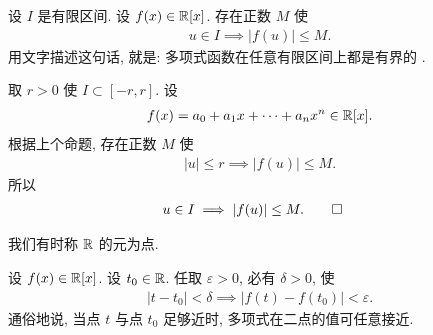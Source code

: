 \begin{proposition}
    设 $I$ 是有限区间. 设 $f(x) \in \mathbb{R}[x]$. 存在正数 $M$ 使
    \begin{align*}
        u \in I \implies |f(u)| \leq M.
    \end{align*}
    用文字描述这句话, 就是: 多项式函数在任意有限区间上都是有界的 .
\end{proposition}

\begin{pf}
    取 $r > 0$ 使 $I \subset [-r, r]$. 设
    \begin{align*}
        f(x) = a_0 + a_1 x + \cdots + a_n x^n \in \mathbb{R}[x].
    \end{align*}
    根据上个命题, 存在正数 $M$ 使
    \begin{align*}
        |u| \leq r \implies |f(u)| \leq M.
    \end{align*}
    所以
    \begin{align*}
         & u \in I \implies |f(u)| \leq M. \qedhere
    \end{align*}
\end{pf}

我们有时称 $\mathbb{R}$ 的元为点.

\begin{proposition}
    设 $f(x) \in \mathbb{R}[x]$. 设 $t_0 \in \mathbb{R}$. 任取 $\varepsilon > 0$, 必有 $\delta > 0$, 使
    \begin{align*}
        |t - t_0| < \delta \implies |f(t) - f(t_0)| < \varepsilon.
    \end{align*}
    通俗地说, 当点 $t$ 与点 $t_0$ 足够近时, 多项式在二点的值可任意接近.
\end{proposition}

